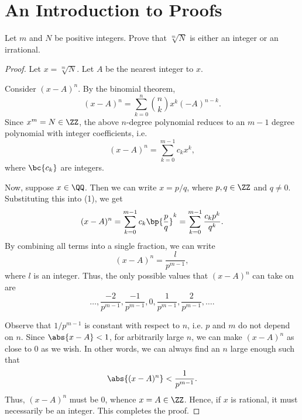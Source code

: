 \section{An Introduction to Proofs}

\begin{problem}
    Let $m$ and $N$ be positive integers. Prove that $\sqrt[m]{N}$ is either an integer or an irrational.
\end{problem}
\begin{proof}
    Let $x = \sqrt[m]{N}$. Let $A$ be the nearest integer to $x$.
    
    Consider $(x-A)^n$. By the binomial theorem, \[(x-A)^n = \sum_{k = 0}^n \binom{n}{k} x^k (-A)^{n-k}.\] Since $x^m = N \in \ZZ$, the above $n$-degree polynomial reduces to an $m-1$ degree polynomial with integer coefficients, i.e. \[(x-A)^n = \sum_{k = 0}^{m-1} c_k x^k, \tag{1}\] where $\bc{c_k}$ are integers.

    Now, suppose $x \in \QQ$. Then we can write $x = p/q$, where $p, q \in \ZZ$ and $q \neq 0$. Substituting this into (1), we get \[(x-A)^n = \sum_{k = 0}^{m-1} c_k \bp{\frac{p}{q}}^k = \sum_{k = 0}^{m-1} \frac{c_k p^k}{q^k}.\] By combining all terms into a single fraction, we can write \[(x-A)^n = \frac{l}{p^{m-1}},\] where $l$ is an integer. Thus, the only possible values that $(x-A)^n$ can take on are \[\dots, \frac{-2}{p^{m-1}}, \frac{-1}{p^{m-1}}, 0, \frac{1}{p^{m-1}}, \frac{2}{p^{m-1}}, \dots.\]

    Observe that $1/p^{m-1}$ is constant with respect to $n$, i.e. $p$ and $m$ do not depend on $n$. Since $\abs{x - A} < 1$, for arbitrarily large $n$, we can make $(x-A)^n$ as close to 0 as we wish. In other words, we can always find an $n$ large enough such that \[\abs{(x-A)^n} < \frac1{p^{m-1}}.\] Thus, $(x-A)^n$ must be 0, whence $x = A \in \ZZ$. Hence, if $x$ is rational, it must necessarily be an integer. This completes the proof.
\end{proof}

